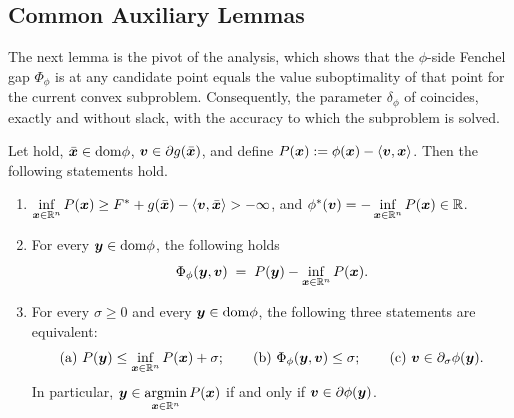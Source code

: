 \subsection{Common Auxiliary Lemmas}

The next lemma is the pivot of the analysis, which shows that the $\phi$-side Fenchel gap $\Phi_\phi$ is at any candidate point equals the value suboptimality of that
point for the current convex subproblem. Consequently, the parameter
$\delta_\phi$ of  coincides, exactly and
without slack, with the accuracy to which the subproblem is solved.

\begin{lemma}
\label{lem:dca-subproblem-value}
Let  hold, $\bar{\bm{x}}\in\mathrm{dom}\phi$,
$\bm{v}\in\partial g(\bar{\bm{x}})$, and define
$P(\bm{x}):=\phi(\bm{x})-\langle\bm{v},\bm{x}\rangle$. Then the following statements
hold.
\begin{enumerate}
    \item[(i)] $\inf\limits_{\bm{x}\in\mathbb{R}^n}P(\bm{x})\ge
    F^\ast+g(\bar{\bm{x}})-\langle\bm{v},\bar{\bm{x}}\rangle>-\infty$, and
    $\phi^*(\bm{v})=-\inf\limits_{\bm{x}\in\mathbb{R}^n}P(\bm{x})\in\mathbb{R}$.
    \item[(ii)] For every $\bm{y}\in\mathrm{dom}\phi$, the following holds
    \[
        \Phi_\phi(\bm{y},\bm{v})
        \;=\;
        P(\bm{y})-\inf\limits_{\bm{x}\in\mathbb{R}^n}P(\bm{x}).
    \]
    \item[(iii)] For every $\sigma\ge0$ and every $\bm{y}\in\mathrm{dom}\phi$, the
    following three statements are equivalent:
    \[
        \text{(a) }P(\bm{y})\le\inf\limits_{\bm{x}\in\mathbb{R}^n}P(\bm{x})+\sigma;
        \qquad
        \text{(b) }\Phi_\phi(\bm{y},\bm{v})\le\sigma;
        \qquad
        \text{(c) }\bm{v}\in\partial_\sigma\phi(\bm{y}).
    \]
    In particular, $\bm{y}\in\operatorname*{\mathrm{argmin}}\limits_{\bm{x}\in\mathbb{R}^n}P(\bm{x})$ if and only if
    $\bm{v}\in\partial\phi(\bm{y})$.
\end{enumerate}
\end{lemma}

